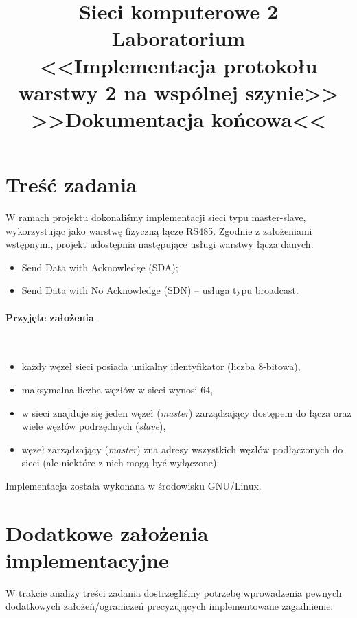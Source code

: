 \documentclass[a4paper,12pt]{article}
\title{
    \textbf{Sieci komputerowe 2 \\ Laboratorium} \\
    {\normalsize<<Implementacja protokołu warstwy 2 na wspólnej szynie>>} \\
    {\large{>>Dokumentacja końcowa<<}}
}
\author{
    \makebox[8em][c]{Piotr Bałut} \and
    \makebox[8em][c]{Maciej Rubikowski} \and
    \makebox[8em][c]{Tomasz Pieczerak}
}
\begin{document}
\maketitle

\section{Treść zadania}
W ramach projektu dokonaliśmy implementacji sieci typu master-slave,
wykorzystując jako warstwę fizyczną łącze RS485. Zgodnie z założeniami
wstępnymi, projekt udostępnia następujące usługi warstwy łącza danych:

\begin{itemize}
  \item Send Data with Acknowledge (SDA);
  \item Send Data with No Acknowledge (SDN) -- usługa typu broadcast.
\end{itemize}

\paragraph{Przyjęte założenia}\

\begin{itemize}
  \item każdy węzeł sieci posiada unikalny identyfikator (liczba 8-bitowa),
  \item maksymalna liczba węzłów w sieci wynosi $64$,
  \item w sieci znajduje się jeden węzeł (\emph{master}) zarządzający
        dostępem do łącza oraz wiele węzłów podrzędnych (\emph{slave}),
  \item węzeł zarządzający (\emph{master}) zna adresy wszystkich węzłów
        podłączonych do sieci (ale niektóre z nich mogą być wyłączone).
\end{itemize}

Implementacja została wykonana w środowisku GNU/Linux.

\section{Dodatkowe założenia implementacyjne}

W trakcie analizy treści zadania dostrzegliśmy potrzebę wprowadzenia pewnych
dodatkowych założeń/ograniczeń precyzujących implementowane zagadnienie:
\end{document}
